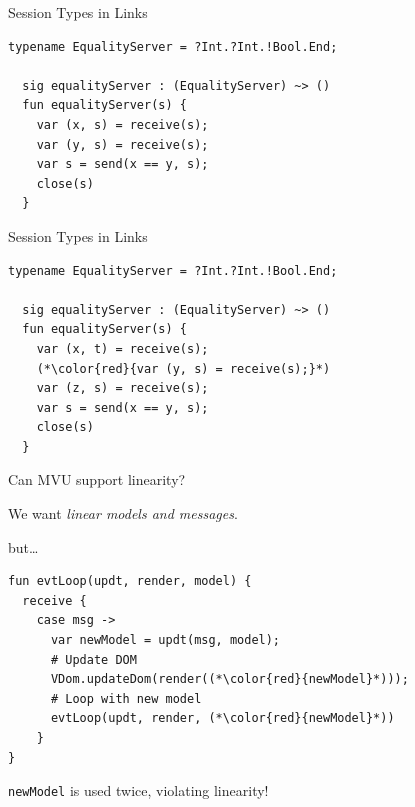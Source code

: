 \documentclass[11.5pt, aspectratio=169]{beamer}
\begin{document}
\begin{frame}[fragile]{Session Types in Links}

\begin{lstlisting}[language=links]
  typename EqualityServer = ?Int.?Int.!Bool.End;

  sig equalityServer : (EqualityServer) ~> ()
  fun equalityServer(s) {
    var (x, s) = receive(s);
    var (y, s) = receive(s);
    var s = send(x == y, s);
    close(s)
  }
\end{lstlisting}
\end{frame}

\begin{frame}[fragile]{Session Types in Links}
\begin{lstlisting}[language=links]
  typename EqualityServer = ?Int.?Int.!Bool.End;

  sig equalityServer : (EqualityServer) ~> ()
  fun equalityServer(s) {
    var (x, t) = receive(s);
    (*\color{red}{var (y, s) = receive(s);}*)
    var (z, s) = receive(s);
    var s = send(x == y, s);
    close(s)
  }
\end{lstlisting}
\end{frame}

\begin{frame}[fragile]{Can MVU support linearity?}

  \begin{fullpageitemize}
  \item We want \emph{linear models and messages}.
    \begin{itemize}
      \itemR but\ldots
    \end{itemize}
  \end{fullpageitemize}

  \begin{lstlisting}[language=links]
fun evtLoop(updt, render, model) {
  receive {
    case msg ->
      var newModel = updt(msg, model);
      # Update DOM
      VDom.updateDom(render((*\color{red}{newModel}*)));
      # Loop with new model
      evtLoop(updt, render, (*\color{red}{newModel}*))
    }
}
  \end{lstlisting}

  \begin{fullpageitemize}
    \item \texttt{newModel} is used twice, violating linearity!
  \end{fullpageitemize}
\end{frame}
\end{document}
